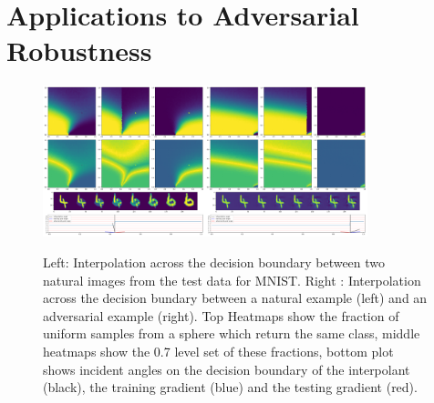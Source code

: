 \section{Applications to Adversarial Robustness}

\begin{figure}[ht!]
    \centering
    \includegraphics[width=0.42\textwidth]{c5_figures/stab-mnist-C32-50-50-10-0.001-eval-1e-06-none-4-6-db_interp-stability-50.png}\includegraphics[width=0.42\textwidth]{c5_figures/stab-mnist-C32-50-50-10-0.001-eval-1e-06-pgd-4-6-db_interp-stability-50.png}

    \caption{Left: Interpolation across the decision boundary between
      two natural images from the test data for MNIST. Right :
      Interpolation across the decision bundary between a natural
      example (left) and an adversarial example (right). Top Heatmaps
      show the fraction of uniform samples from a sphere which return
      the same class, middle  heatmaps show the 0.7 level set of these
      fractions, bottom plot shows incident angles on the decision
      boundary of the interpolant (black), the training gradient
      (blue) and the testing gradient (red). }
    \label{fig:dbs}
\end{figure}


